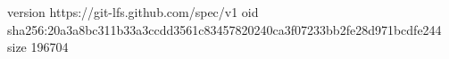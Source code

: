 version https://git-lfs.github.com/spec/v1
oid sha256:20a3a8bc311b33a3ccdd3561c83457820240ca3f07233bb2fe28d971bcdfe244
size 196704
